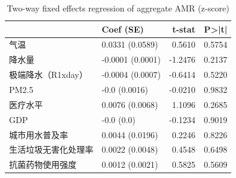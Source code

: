 \begin{table}
\caption{Two-way fixed effects regression of aggregate AMR (z-score)}
\label{tab:amr_fe}
\begin{tabular}{llrr}
\toprule
 & Coef (SE) & t-stat & P>|t| \\
\midrule
气温 & 0.0331
(0.0589) & 0.5610 & 0.5754 \\
降水量 & -0.0001
(0.0001) & -1.2476 & 0.2137 \\
极端降水（R1xday） & -0.0004
(0.0007) & -0.6414 & 0.5220 \\
PM2.5 & -0.0
(0.0016) & -0.0210 & 0.9832 \\
医疗水平 & 0.0076
(0.0068) & 1.1096 & 0.2685 \\
GDP & -0.0
(0.0) & -0.1234 & 0.9019 \\
城市用水普及率 & 0.0044
(0.0196) & 0.2246 & 0.8226 \\
生活垃圾无害化处理率 & 0.0022
(0.0048) & 0.4548 & 0.6498 \\
抗菌药物使用强度 & 0.0012
(0.0021) & 0.5825 & 0.5609 \\
\bottomrule
\end{tabular}
\end{table}
